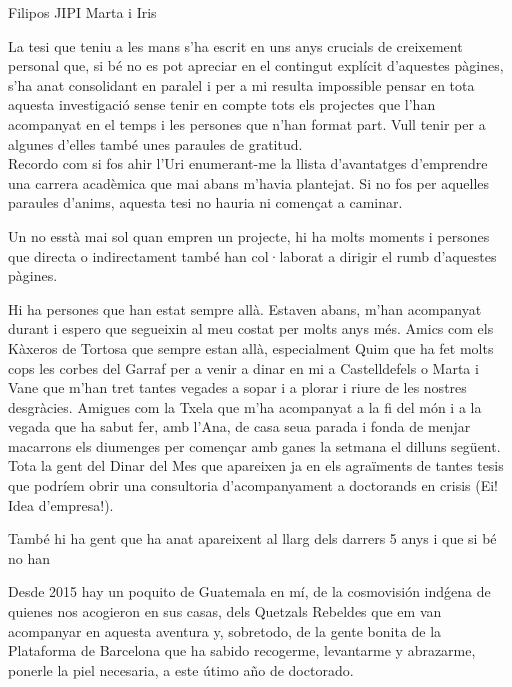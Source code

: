 \documentclass[
11pt, %
english, %
onehalfspacing %
]{MastersDoctoralThesis} %
\begin{document}
\begin{acknowledgements}
\addchaptertocentry{\acknowledgementname} %

Filipos
JIPI
Marta i Iris

La tesi que teniu a les mans s'ha escrit en uns anys crucials de creixement personal que, si bé no es pot apreciar en el contingut explícit d'aquestes pàgines, s'ha anat consolidant en paralel i per a mi resulta impossible pensar en tota aquesta investigació sense tenir en compte tots els projectes que l'han acompanyat en el temps i les persones que n'han format part. Vull tenir per a algunes d'elles també unes paraules de gratitud.\\


Recordo com si fos ahir l'Uri enumerant-me la llista d'avantatges d'emprendre una carrera acadèmica que mai abans m'havia plantejat. Si no fos per aquelles paraules d'anims, aquesta tesi no hauria ni començat a caminar.

Un no esstà mai sol quan empren un projecte, hi ha molts moments i persones que directa o indirectament també han col·laborat a dirigir el rumb d'aquestes pàgines.

Hi ha persones que han estat sempre allà. Estaven abans, m'han acompanyat durant i espero que segueixin al meu costat per molts anys més. Amics com els Kàxeros de Tortosa que sempre estan allà, especialment Quim que ha fet molts cops les corbes del Garraf per a venir a dinar en mi a Castelldefels o Marta i Vane que m'han tret tantes vegades a sopar i a plorar i riure de les nostres desgràcies. Amigues com la Txela que m'ha acompanyat a la fi del món i a la vegada que ha sabut fer, amb l'Ana, de casa seua parada i fonda de menjar macarrons els diumenges per començar amb ganes la setmana el dilluns següent. Tota la gent del Dinar del Mes que apareixen ja en els agraïments de tantes tesis que podríem obrir una consultoria d'acompanyament a doctorands en crisis (Ei! Idea d'empresa!).

També hi ha gent que ha anat apareixent al llarg dels darrers 5 anys i que si bé no han

Desde 2015 hay un poquito de Guatemala en m\'i, de la cosmovisión ind\'gena de quienes nos acogieron en sus casas, dels Quetzals Rebeldes que em van acompanyar en aquesta aventura y, sobretodo, de la gente bonita de la Plataforma de Barcelona que ha sabido recogerme, levantarme y abrazarme, ponerle la piel necesaria, a este \'utimo año de doctorado.
%

\end{acknowledgements}
\end{document}
